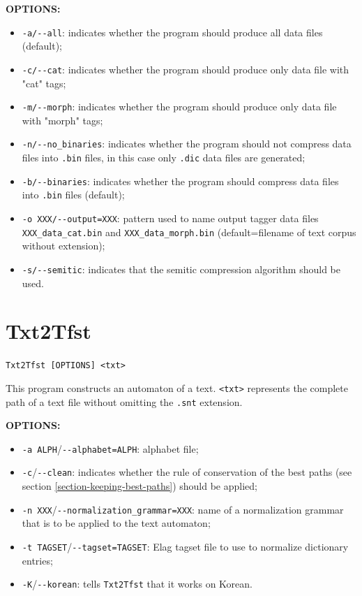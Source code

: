 \bigskip
\noindent \textbf{OPTIONS:}
\begin{itemize}
  \item \verb+-a/--all+: indicates whether the program should produce all data files (default);
  \item \verb+-c/--cat+: indicates whether the program should produce only data file with "cat" tags;
  \item \verb+-m/--morph+: indicates whether the program should produce only data file with "morph" tags;
  \item \verb+-n/--no_binaries+: indicates whether the program should not compress data files into
  \verb+.bin+ files, in this case only \verb+.dic+ data files are generated;
  \item \verb+-b/--binaries+: indicates whether the program should compress data files into 
  \verb+.bin+ files (default);
  \item \verb+-o XXX/--output=XXX+: pattern used to name output tagger data files \verb+XXX_data_cat.bin+
  and \verb+XXX_data_morph.bin+ (default=filename of text corpus without extension);
  \item \verb+-s/--semitic+: indicates that the semitic compression algorithm should be used.
\end{itemize}

\bigskip

\section{Txt2Tfst} \verb+Txt2Tfst [OPTIONS] <txt>+

\bigskip
\noindent This program constructs an automaton of a text. \verb+<txt>+
represents the complete path of a text file without omitting the \verb+.snt+
extension.

\bigskip
\noindent \textbf{OPTIONS:}
\begin{itemize}
  \item \verb+-a ALPH+/\verb+--alphabet=ALPH+: alphabet file;
  
  \item \verb+-c+/\verb+--clean+: indicates whether the rule of conservation of 
  the best paths (see section \ref{section-keeping-best-paths}) 
  should be applied;
  
  \item \verb+-n XXX+/\verb+--normalization_grammar=XXX+: name of a normalization 
  grammar that is to be applied to the text automaton; 
  \item \verb+-t TAGSET+/\verb+--tagset=TAGSET+: Elag tagset file to use to
  normalize dictionary entries;
  \item \verb+-K+/\verb+--korean+: tells \verb+Txt2Tfst+ that it works on
  Korean.
\end{itemize}

